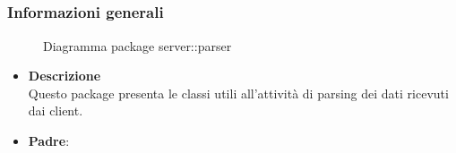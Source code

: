 \subsection{}
\label{\nogloxy{swedesigner::server::parser}}
\subsubsection{Informazioni generali}
\begin{figure}[H]
	\caption{Diagramma package server::parser}
\end{figure}
\begin{itemize}
\item \textbf{Descrizione}\\
Questo package presenta le classi utili all'attività di parsing dei dati ricevuti dai client.
\item \textbf{Padre}: \hyperref[\nogloxy{swedesigner::server}]{}
\end{itemize}
